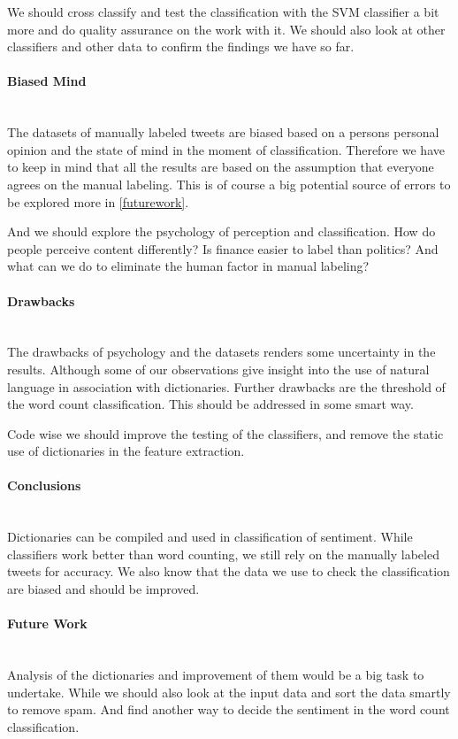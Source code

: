 We should cross classify and test the classification with the SVM classifier a
bit more and do quality assurance on the work with it. We should also look at
other classifiers and other data to confirm the findings we have so far. 

\paragraph{Biased Mind}
\hspace{0pt}\\
The datasets of manually labeled tweets are biased based on a persons 
personal opinion and the state of mind in the moment of classification.
Therefore we have to keep in mind that all the results are based on the
assumption that everyone agrees on the manual labeling. This is of course a big
potential source of errors to be explored more in \ref{futurework}.

And we should explore the psychology of perception and classification. How do
people perceive content differently? Is finance easier to label than politics?
And what can we do to eliminate the human factor in manual labeling? 

\paragraph{Drawbacks}
\hspace{0pt}\\
The drawbacks of psychology and the datasets renders some uncertainty in the
results. Although some of our observations give insight into the use of natural
language in association with dictionaries. 
Further drawbacks are the threshold of the word count classification. This
should be addressed in some smart way. 

Code wise we should improve the testing of the classifiers, and remove the
static use of dictionaries in the feature extraction.  

\paragraph{Conclusions}
\hspace{0pt}\\
Dictionaries can be compiled and used in classification of sentiment. While
classifiers work better than word counting, we still rely on the manually
labeled tweets for accuracy. We also know that the data we use
to check the classification are biased and should be improved. 

\paragraph{Future Work}
\hspace{0pt}\\
Analysis of the dictionaries and improvement of them would be a big task to
undertake. While we should also look at the input data and sort the data
smartly to remove spam. And find another way to decide the sentiment in the
word count classification. 

